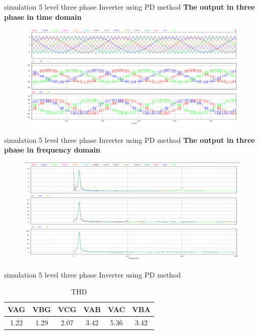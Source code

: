 \documentclass[
	11pt, %
]{beamer}
\begin{document}
\begin{frame}{simulation 5 level three phase Inverter using PD method}
	\scriptsize{\textbf{The output in three phase in time domain}}
	\begin{figure}
        \includegraphics[width=1\linewidth]{Sim_PD_out3p.png}
    \end{figure}
\end{frame}

\begin{frame}{simulation 5 level three phase Inverter using PD method}
	\scriptsize{\textbf{The output in three phase in frequency domain}}
	\begin{figure}
        \includegraphics[width=1\linewidth]{Sim_PD_FFT.png}
    \end{figure}
\end{frame}

\begin{frame}{simulation 5 level three phase Inverter using PD method}
	\begin{table}[htbp]
		\centering
		\caption{THD}
		\label{tab:example}
		\begin{tabular}{|c|c|c|c|c|c|}
			\hline
			VAG & VBG & VCG & VAB & VAC & VBA \\
			\hline
			1.22 & 1.29 & 2.07 & 3.42 & 5.36 & 3.42 \\
			\hline
		\end{tabular}
	\end{table}
\end{frame}
\end{document}
